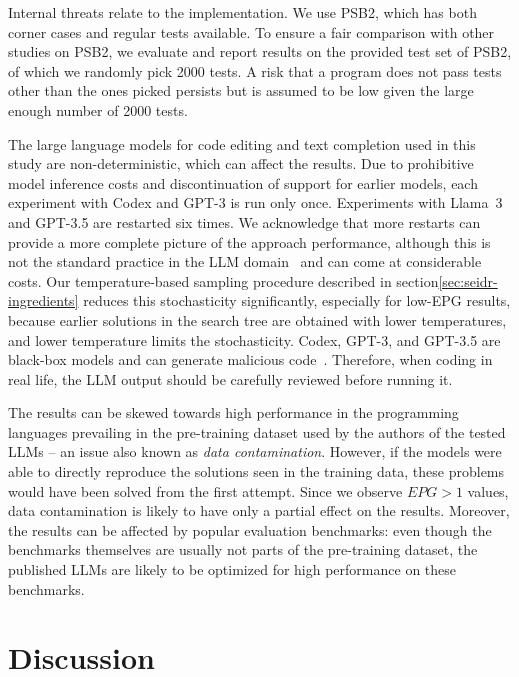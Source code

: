 Internal threats relate to the implementation.
We use PSB2, which has both corner cases and regular tests available. 
To ensure a fair comparison with other studies on PSB2, we evaluate and report results on the provided test set of PSB2, of which we randomly pick 2000 tests. 
A risk that a program does not pass tests other than the ones picked persists but is assumed to be low given the large enough number of 2000 tests. 

The large language models for code editing and text completion used in this study are non-deterministic, 
which can affect the results. 
Due to prohibitive model inference costs and discontinuation of support for earlier models, each experiment with Codex and GPT-3 is run only once. 
Experiments with Llama~3 and GPT-3.5 are restarted six times. 
We acknowledge that more restarts can provide a more complete picture of the approach performance,
although this is not the standard practice in the LLM domain~\cite{ouyangLLMBoxChocolates2023} 
and can come at considerable costs.
Our temperature-based sampling procedure described in section\ref{sec:seidr-ingredients} reduces this stochasticity significantly, especially for low-EPG results, because earlier solutions in the search tree are obtained with lower temperatures, and lower temperature limits the stochasticity.
Codex, GPT-3, and GPT-3.5 are black-box models and can generate malicious code~\cite{pearceAsleepKeyboardAssessing2022}. 
Therefore, when coding in real life, the LLM output should be carefully reviewed before running it.

The results can be skewed towards high performance in the programming languages prevailing in the pre-training dataset used by the authors of the tested LLMs -- an issue also known as \emph{data contamination}.
However, if the models were able to directly reproduce the solutions seen in the training data, 
these problems would have been solved from the first attempt.
Since we observe $EPG>1$ values, data contamination is likely to have only a partial effect on the results.
Moreover, the results can be affected by popular evaluation benchmarks: even though the benchmarks themselves are usually not parts of the pre-training dataset, the published LLMs are likely to be optimized for high performance on these benchmarks.   

\newpage\section{Discussion}
\label{sec:seidr-conclusion}

